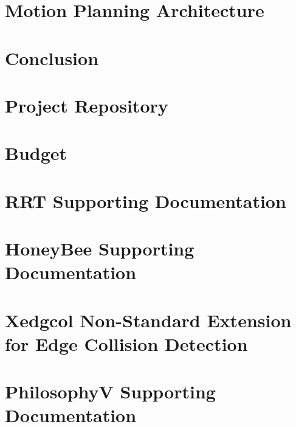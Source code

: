 \documentclass[
    11pt,           %
    letterpaper,    %
    oneside         %
]{report}           %
\begin{document}
\chapter{Motion Planning Architecture}
    \label{chap:MotionPlaningArchitecture}
    

\chapter{Conclusion}
    

\begin{appendices}

\chapter{Project Repository}
    \label{appendix:repository}
    

\chapter{Budget}

\chapter{RRT Supporting Documentation}
    \label{appendix:rrt_appendix}
    

\chapter{HoneyBee Supporting Documentation}
    \label{appendix:honeybee_appendix}
    

\chapter{Xedgcol Non-Standard Extension for Edge Collision Detection}
    \label{appendix:xedgcol_appendix}
    

\chapter{PhilosophyV Supporting Documentation}
    \label{appendix:philv_appendix}
    

\end{appendices} 




\clearpage 

\listoftodos 
\end{document}
